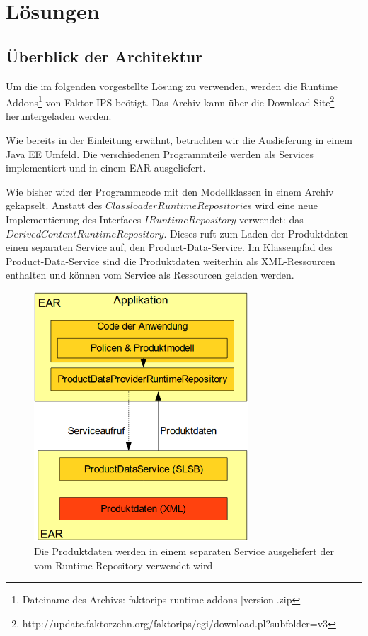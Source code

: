 \documentclass[headsepline=true, footsepline=true]{scrartcl}
\begin{document}
\section{Lösungen}

\subsection{Überblick der Architektur}

Um die im folgenden vorgestellte Lösung zu verwenden, werden
die Runtime Addons\footnote{Dateiname des Archivs:
faktorips-runtime-addons-[version].zip} von Faktor-IPS beötigt. Das Archiv kann
über die Download-Site\footnote{http://update.faktorzehn.org/faktorips/cgi/download.pl?subfolder=v3} heruntergeladen werden.

Wie bereits in der Einleitung erwähnt, betrachten wir die Auslieferung in einem
Java EE Umfeld. Die verschiedenen Programmteile werden als Services implementiert
und in einem EAR ausgeliefert.

Wie bisher wird der Programmcode mit den Modellklassen in einem Archiv gekapselt.
Anstatt des $ClassloaderRuntimeRepositorie$s wird eine neue Implementierung des
Interfaces $IRuntimeRepository$ verwendet: das
$DerivedContentRuntimeRepository$. Dieses ruft zum Laden der Produktdaten einen separaten Service auf, den
Product-Data-Service. Im Klassenpfad des Product-Data-Service sind die
Produktdaten weiterhin als XML-Ressourcen enthalten und können vom Service als
Ressourcen geladen werden.

\begin{figure}[htb] \centering
\includegraphics[width=8cm]{./pics/service_architecture.png} \caption{Die
Produktdaten werden in einem separaten Service ausgeliefert der vom Runtime
Repository verwendet wird}
\label{service_architecture}
\end{figure}
\end{document}
